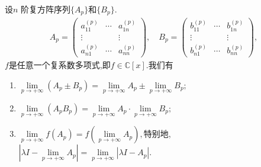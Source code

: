 \documentclass[../../main.tex]{subfiles}
\begin{document}
\begin{theorem}[复矩阵极限的性质]\label{theorem:复矩阵极限的性质}
设$n$ 阶复方阵序列$\{A_p\}$和$\{B_p\}$.
\begin{align*}
A_p = \begin{pmatrix}
a_{11}^{(p)} & \cdots & a_{1n}^{(p)} \\
\vdots & & \vdots \\
a_{n1}^{(p)} & \cdots & a_{nn}^{(p)}
\end{pmatrix},\quad B_p = \begin{pmatrix}
b_{11}^{(p)} & \cdots & b_{1n}^{(p)} \\
\vdots & & \vdots \\
b_{n1}^{(p)} & \cdots & b_{nn}^{(p)}
\end{pmatrix},
\end{align*}
$f$是任意一个复系数多项式,即$f\in \mathbb{C}[x]$.我们有
\begin{enumerate}[(1)]
\item $\underset{p\rightarrow +\infty}{\lim}\left( A_p\pm B_p \right) =\underset{p\rightarrow +\infty}{\lim}A_p\pm \underset{p\rightarrow +\infty}{\lim}B_p;$

\item $\underset{p\rightarrow +\infty}{\lim}\left( A_pB_p \right) =\underset{p\rightarrow +\infty}{\lim}A_p\cdot \underset{p\rightarrow +\infty}{\lim}B_p;$

\item $
\underset{p\rightarrow +\infty}{\lim}f\left( A_p \right) =f\left( \underset{p\rightarrow +\infty}{\lim}A_p \right) ,$特别地,$\left| \lambda I-\underset{p\rightarrow +\infty}{\lim}A_p \right|=\underset{p\rightarrow +\infty}{\lim}\left| \lambda I-A_p \right|.$
\end{enumerate}
\end{theorem}
\end{document}
